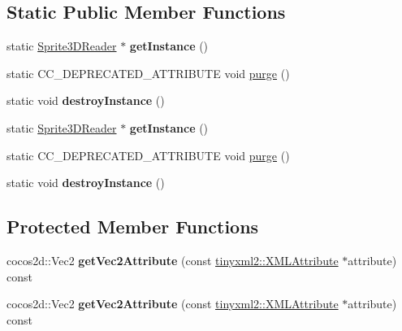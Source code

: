 \subsection*{Static Public Member Functions}
\begin{DoxyCompactItemize}
\item 
\mbox{\label{classcocostudio_1_1Sprite3DReader_a9f796d16a532649a777b820315d9a0d9}} 
static \hyperlink{classcocostudio_1_1Sprite3DReader}{Sprite3\+D\+Reader} $\ast$ {\bfseries get\+Instance} ()
\item 
static C\+C\+\_\+\+D\+E\+P\+R\+E\+C\+A\+T\+E\+D\+\_\+\+A\+T\+T\+R\+I\+B\+U\+TE void \hyperlink{classcocostudio_1_1Sprite3DReader_af88a74ae016a6d393a67a314fb20d7c7}{purge} ()
\item 
\mbox{\label{classcocostudio_1_1Sprite3DReader_a76900bc42f8a023e7c146d97eab8ed07}} 
static void {\bfseries destroy\+Instance} ()
\item 
\mbox{\label{classcocostudio_1_1Sprite3DReader_a598cd817b7b8f539c0d289a96238d283}} 
static \hyperlink{classcocostudio_1_1Sprite3DReader}{Sprite3\+D\+Reader} $\ast$ {\bfseries get\+Instance} ()
\item 
static C\+C\+\_\+\+D\+E\+P\+R\+E\+C\+A\+T\+E\+D\+\_\+\+A\+T\+T\+R\+I\+B\+U\+TE void \hyperlink{classcocostudio_1_1Sprite3DReader_a7c1c07873821711c7dfa1acdd4f98acd}{purge} ()
\item 
\mbox{\label{classcocostudio_1_1Sprite3DReader_a956730a71679adce74d55ab35234a036}} 
static void {\bfseries destroy\+Instance} ()
\end{DoxyCompactItemize}
\subsection*{Protected Member Functions}
\begin{DoxyCompactItemize}
\item 
\mbox{\label{classcocostudio_1_1Sprite3DReader_af7ffc46da6fc14766351c19d7507f13f}} 
cocos2d\+::\+Vec2 {\bfseries get\+Vec2\+Attribute} (const \hyperlink{classtinyxml2_1_1XMLAttribute}{tinyxml2\+::\+X\+M\+L\+Attribute} $\ast$attribute) const
\item 
\mbox{\label{classcocostudio_1_1Sprite3DReader_ab9631e929f19901a70436ef97b7463d6}} 
cocos2d\+::\+Vec2 {\bfseries get\+Vec2\+Attribute} (const \hyperlink{classtinyxml2_1_1XMLAttribute}{tinyxml2\+::\+X\+M\+L\+Attribute} $\ast$attribute) const
\end{DoxyCompactItemize}



